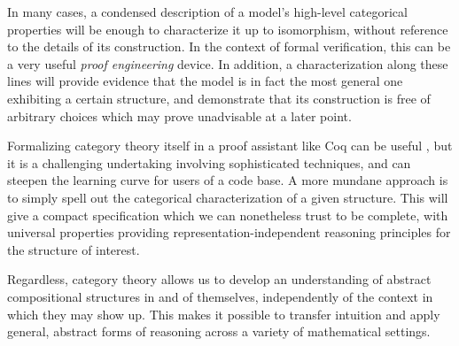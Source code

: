 \documentclass[11pt,oneside,draft]{book}
\theoremstyle{definition}
\begin{document}
In many cases,
a condensed description of
a model's high-level categorical properties
will be enough to characterize it
up to isomorphism,
without reference to the details of its construction.
In the context of formal verification,
this can be a very useful \emph{proof engineering} device.
In addition,
a characterization along these lines
will provide evidence that
the model is in fact the most general one
exhibiting a certain structure,
and demonstrate that its construction is free of arbitrary choices
which may prove unadvisable at a later point.

Formalizing category theory itself
in a proof assistant like Coq
can be useful \citep{math-classes},
but it is a challenging undertaking
involving sophisticated techniques,
and can steepen the learning curve
for users of a code base.
A more mundane approach
is to simply spell out
the categorical characterization of a given structure.
This will give a compact specification
which we can nonetheless trust to be complete,
with universal properties
providing
representation-independent reasoning principles
for the structure of interest.

Regardless,
category theory allows us
to develop an understanding of abstract compositional structures
in and of themselves,
independently of the context in which they may show up.
This makes it possible to transfer intuition
and apply general, abstract forms of reasoning
across a variety of mathematical settings.
\end{document}
